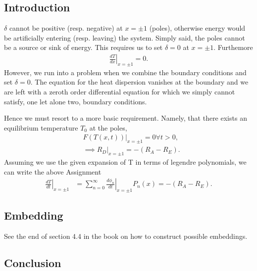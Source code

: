 \subsection{Introduction}
    $\delta$ cannot be positive (resp. negative) at $x = \pm 1$ (poles), otherwise energy would be
    artificially entering (resp. leaving) the system. Simply said, the poles cannot be a source or sink of energy.
    This requires us to set $\delta = 0$ at $x = \pm 1$. Furthemore 
    \begin{align*}
            \left.\frac{d T}{dx}\right|_{x = \pm 1} = 0.
    \label{eq:bcs}
    \end{align*}
    However, we run into a problem when we combine the boundary conditions and set $\delta = 0$. The 
    equation for the heat dispersion vanishes at the boundary and we are left with a zeroth order differential equation 
    for which we simply cannot satisfy, one let alone two, boundary conditions.

    Hence we must resort to a more basic requirement. Namely, that there exists an equilibrium temperature $T_0$ at the poles,
    \begin{align*}
        &\left.F(T(x, t))\right|_{x=\pm 1} = 0 \forall t > 0,\\
        &\implies \left.R_D\right|_{x=\pm 1} = -(R_A - R_E).
    \end{align*}
    Assuming we use the given expansion of T in terms of legendre polynomials, we can write the above Assignment
    \begin{align*}
        \left.\frac{d T}{dt}\right|_{x=\pm 1} &= \sum_{n=0}^{\infty} \left.\frac{d \phi_n}{dt}\right|_{x=\pm 1} P_n(x) = -(R_A - R_E).
    \end{align*}


\subsection{Embedding}
    See the end of section 4.4 in the book on how to construct possible embeddings.

\subsection{Conclusion}